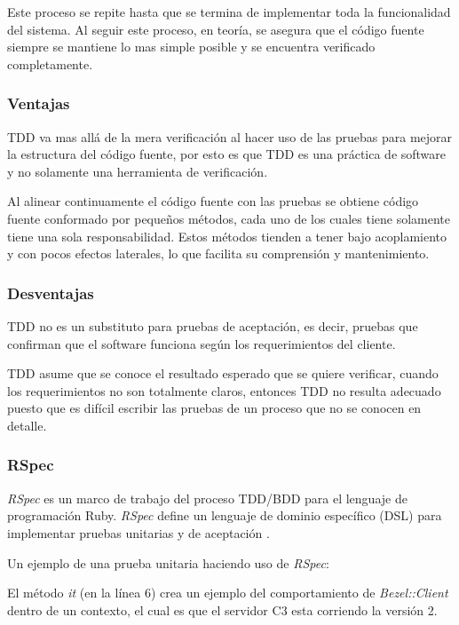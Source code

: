 Este proceso se repite hasta que se termina de implementar toda la funcionalidad
del sistema. Al seguir este proceso, en teoría, se asegura que el código fuente
siempre se mantiene lo mas simple posible y se encuentra verificado completamente.

\subsubsection{Ventajas}
TDD va mas allá de la mera verificación al hacer uso de las pruebas para
mejorar la estructura del código fuente, por esto es que TDD es una práctica
de software y no solamente una herramienta de verificación.

Al alinear continuamente el código fuente con las pruebas se obtiene código fuente
conformado por pequeños métodos, cada uno de los cuales tiene solamente tiene
una sola responsabilidad. Estos métodos tienden a tener bajo acoplamiento y
con pocos efectos laterales, lo que facilita su comprensión y mantenimiento.

\subsubsection{Desventajas}
TDD no es un substituto para pruebas de aceptación, es decir, pruebas que confirman
que el software funciona según los requerimientos del cliente.

TDD asume que se conoce el resultado esperado que se quiere verificar,
cuando los requerimientos no son totalmente claros, entonces TDD no resulta adecuado
puesto que es difícil escribir las pruebas de un proceso que no se conocen en
detalle.

\subsubsection{RSpec}
\textit{RSpec} es un marco de trabajo del proceso TDD/BDD para el lenguaje de
programación Ruby. \textit{RSpec} define un lenguaje de dominio específico (DSL)
para implementar pruebas unitarias y de aceptación \cite{23_chelimsky_2010}.

\vspace{2.5mm}

Un ejemplo de una prueba unitaria haciendo uso de \textit{RSpec}:


El método \textit{it} (en la línea 6) crea un ejemplo del comportamiento de
\textit{Bezel::Client} dentro de un contexto, el cual es que el servidor C3
esta corriendo la versión 2.

